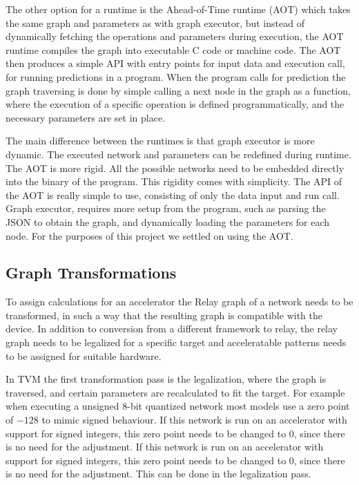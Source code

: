 \documentclass[12pt,a4paper,english
]{tunithesis}
\begin{document}
The other option for a runtime is the Ahead-of-Time runtime (AOT) which takes the same graph and parameters as with graph executor, but instead of dynamically fetching the operations and parameters during execution, the AOT runtime compiles the graph into executable C code or machine code. The AOT then produces a simple API with entry points for input data and execution call, for running predictions in a program. When the program calls for prediction the graph traversing is done by simple calling a next node in the graph as a function, where the execution of a specific operation is defined programmatically, and the necessary parameters are set in place.

The main difference between the runtimes is that graph executor is more dynamic. The executed network and parameters can be redefined during runtime. The AOT is more rigid. All the possible networks need to be embedded directly into the binary of the program. This rigidity comes with simplicity. The API of the AOT is really simple to use, consisting of only the data input and run call. Graph executor, requires more setup from the program, such as parsing the JSON to obtain the graph, and dynamically loading the parameters for each node. For the purposes of this project we settled on using the AOT.

\subsection{Graph Transformations}
To assign calculations for an accelerator the Relay graph of a network needs to be transformed, in such a way that the resulting graph is compatible with the device. In addition to conversion from a different framework to relay, the relay graph needs to be legalized for a specific target and acceleratable patterns needs to be assigned for suitable hardware.

In TVM the first transformation pass is the legalization, where the graph is traversed, and certain parameters are recalculated to fit the target. For example when executing a unsigned 8-bit quantized network most models use a zero point of $-128$ to mimic signed behaviour. If this network is run on an accelerator with support for signed integers, this zero point needs to be changed to 0, since there is no need for the adjustment. If this network is run on an accelerator with support for signed integers, this zero point needs to be changed to 0, since there is no need for the adjustment. This can be done in the legalization pass.
\end{document}
